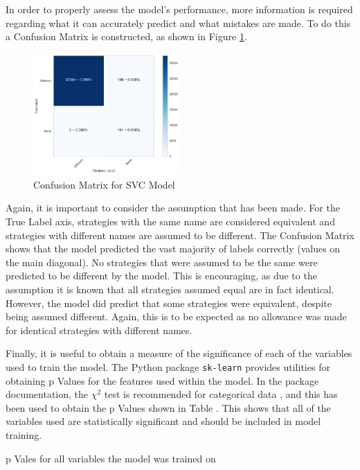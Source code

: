 In order to properly assess the model's performance, more information is required regarding what it can accurately predict and what mistakes are made.
To do this a Confusion Matrix is constructed, as shown in Figure \ref{fig:conf_matrix}.

\begin{figure}[htbp!]
    \centering
    \includegraphics[width=0.5\textwidth]{../img/ML/confusion_matrix.png}
    \caption{Confusion Matrix for SVC Model}
    \label{fig:conf_matrix}
\end{figure}

Again, it is important to consider the assumption that has been made.
For the True Label axis, strategies with the same name are considered equivalent and strategies with different names are assumed to be different.
The Confusion Matrix shows that the model predicted the vast majority of labels correctly (values on the main diagonal).
No strategies that were assumed to be the same were predicted to be different by the model.
This is encouraging, as due to the assumption it is known that all strategies assumed equal are in fact identical.
However, the model did predict that some strategies were equivalent, despite being assumed different.
Again, this is to be expected as no allowance was made for identical strategies with different names.

Finally, it is useful to obtain a measure of the significance of each of the variables used to train the model.
The Python package \texttt{sk-learn} provides utilities for obtaining p Values for the features used within the model.
In the package documentation, the $\chi^2$ test is recommended for categorical data \cite{scikit-learn-docs}, and this has been used to obtain the p Values shown in Table .
This shows that all of the variables used are statistically significant and should be included in model training.

\begin{table}[htbp!]
    \centering
    
    \caption{p Vales for all variables the model was trained on}
    \label{tab:pvalues}
\end{table}

